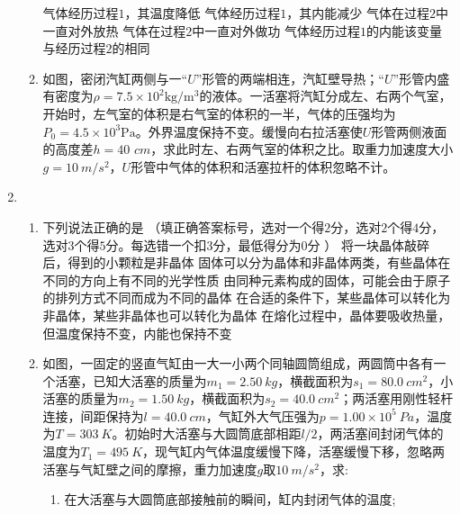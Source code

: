 \begin{enumerate}[leftmargin=0em]
\begin{enumerate}
\fivechoices
{气体经历过程$ 1 $，其温度降低}
{气体经历过程$ 1 $，其内能减少}
{气体在过程$ 2 $中一直对外放热}
{气体在过程$ 2 $中一直对外做功}
{气体经历过程$ 1 $的内能该变量与经历过程$ 2 $的相同}



\item 
如图，密闭汽缸两侧与一“$ U $”形管的两端相连，汽缸壁导热；“$ U $”形管内盛有密度为$\rho = 7.5 \times 10 ^ { 2 } \mathrm { kg } / \mathrm { m } ^ { 3 }$的液体。一活塞将汽缸分成左、右两个气室，开始时，左气室的体积是右气室的体积的一半，气体的压强均为$P _ { 0 } = 4.5 \times 10 ^ { 3 } \mathrm { Pa }$。外界温度保持不变。缓慢向右拉活塞使$ U $形管两侧液面的高度差$ h=40 $ $ cm $，求此时左、右两气室的体积之比。取重力加速度大小$ g=10\ m/s^{2} $，$ U $形管中气体的体积和活塞拉杆的体积忽略不计。
\begin{figure}[h!]
\flushright

\end{figure}





\end{enumerate}


\newpage
\item 
{}
\begin{enumerate}
\renewcommand{\labelenumi}{\arabic{enumi}.}
\item
下列说法正确的是  
（填正确答案标号，选对一个得$ 2 $分，选对$ 2 $个得$ 4 $分，选对$ 3 $个得$ 5 $分。每选错一个扣$ 3 $分，最低得分为$ 0 $分 ）
\fivechoices
{将一块晶体敲碎后，得到的小颗粒是非晶体}
{固体可以分为晶体和非晶体两类，有些晶体在不同的方向上有不同的光学性质}
{由同种元素构成的固体，可能会由于原子的排列方式不同而成为不同的晶体}
{在合适的条件下，某些晶体可以转化为非晶体，某些非晶体也可以转化为晶体}
{在熔化过程中，晶体要吸收热量，但温度保持不变，内能也保持不变}

\item 
如图，一固定的竖直气缸由一大一小两个同轴圆筒组成，两圆筒中各有一个活塞，已知大活塞的质量为$ m_{1}=2.50 \ kg $，横截面积为$ s_1=80.0 \ cm^{2} $，小活塞的质量为$ m_{2}=1.50 \ kg $，横截面积为$ s_2=40.0 \ cm^{2} $；两活塞用刚性轻杆连接，间距保持为$ l=40.0 \ cm $，气缸外大气压强为$ p=1.00 \times 10^5\ Pa $，温度为$ T=303\ K $。初始时大活塞与大圆筒底部相距$ l/2 $，两活塞间封闭气体的温度为$ T_1=495\ K $，现气缸内气体温度缓慢下降，活塞缓慢下移，忽略两活塞与气缸壁之间的摩擦，重力加速度$ g $取$ 10 \ m/s ^{2} $，求:
\begin{enumerate}
\renewcommand{\labelenumi}{\arabic{enumi}.}
\item
在大活塞与大圆筒底部接触前的瞬间，缸内封闭气体的温度;


\end{enumerate}
\end{enumerate}
\end{enumerate}
